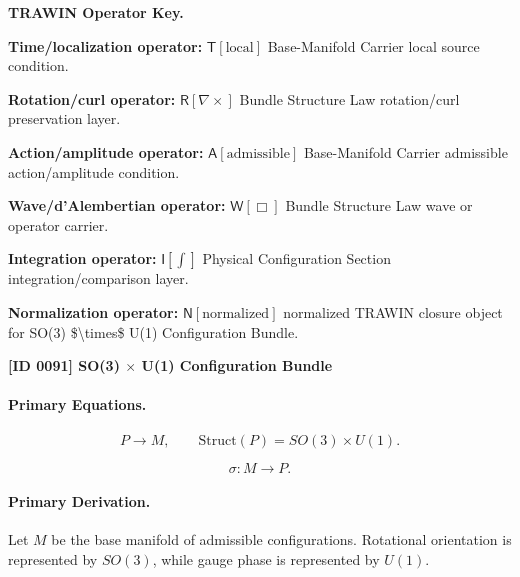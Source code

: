 \par\vspace{0.45\baselineskip}
\noindent\begin{minipage}[t]{\linewidth}
\begingroup
\small
\raggedright
\textbf{TRAWIN Operator Key.}\par
\noindent\textbf{Time/localization operator:} $\mathsf{T}\!\left[\mathrm{local}\right]$ Base-Manifold Carrier local source condition.\par
\noindent\textbf{Rotation/curl operator:} $\mathsf{R}\!\left[\nabla\times\right]$ Bundle Structure Law rotation/curl preservation layer.\par
\noindent\textbf{Action/amplitude operator:} $\mathsf{A}\!\left[\mathrm{admissible}\right]$ Base-Manifold Carrier admissible action/amplitude condition.\par
\noindent\textbf{Wave/d'Alembertian operator:} $\mathsf{W}\!\left[\Box\right]$ Bundle Structure Law wave or operator carrier.\par
\noindent\textbf{Integration operator:} $\mathsf{I}\!\left[\int\right]$ Physical Configuration Section integration/comparison layer.\par
\noindent\textbf{Normalization operator:} $\mathsf{N}\!\left[\mathrm{normalized}\right]$ normalized TRAWIN closure object for SO(3) \$\textbackslash{}times\$ U(1) Configuration Bundle.\par
\endgroup
\end{minipage}

\clearpage
\noindent\textbf{[ID 0091] SO(3) $\times$ U(1) Configuration Bundle}\par
\vspace{0.35em}
\paragraph{Primary Equations.}
\begin{equation}
P \longrightarrow M,
\qquad
\mathrm{Struct}(P)=SO(3)\times U(1).
\end{equation}

\begin{equation}
\sigma:M\longrightarrow P.
\end{equation}

\paragraph{Primary Derivation.}
Let $M$ be the base manifold of admissible configurations. Rotational orientation is represented by $SO(3)$, while gauge phase is represented by $U(1)$.

